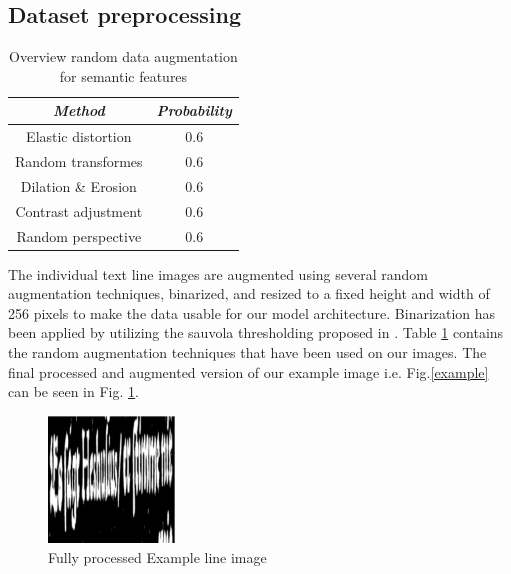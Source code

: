 \documentclass[conference]{IEEEtran}
\begin{document}
\subsection{Dataset preprocessing}

\begin{table}[htbp]
\caption{Overview random data augmentation for semantic features}
\begin{center}
\begin{tabular}{|c|c|}
\hline
\textbf{\textit{Method}} & \textbf{\textit{Probability}}  \\
\hline
Elastic distortion \cite{yousef2020origaminet} & 0.6 \\
\hline
Random transformes \cite{yousef2020origaminet} & 0.6 \\
\hline
Dilation \& Erosion & 0.6 \\
\hline
Contrast adjustment & 0.6 \\
\hline
Random perspective \cite{NEURIPS2019_9015} & 0.6 \\
\hline
\end{tabular}
\label{data_aug}
\end{center}
\end{table}
The individual text line images are augmented using several random augmentation techniques, binarized, and resized to a fixed height and width of 256 pixels to make the data usable for our model architecture. Binarization has been applied by utilizing the sauvola thresholding proposed in \cite{SAUVOLA2000225}. Table \ref{data_aug} contains the random augmentation techniques that have been used on our images. The final processed and augmented version of our example image i.e. Fig.\ref{example} can be seen in Fig. \ref{line_img}. \newline
\begin{figure}[htbp]
    \centering
    \includegraphics[width=0.3\textwidth]{figures/processed_line_image.png}
    \caption{Fully processed Example line image}
    \label{line_img}
\end{figure}\newline
\end{document}
